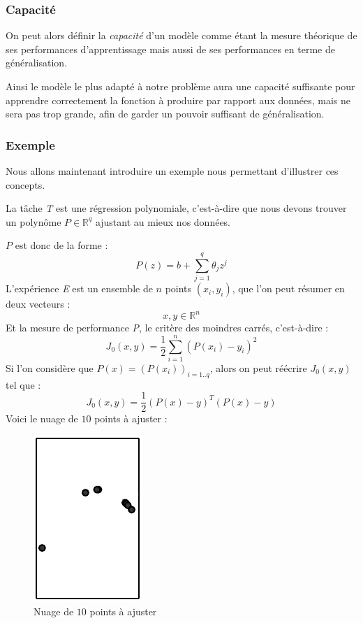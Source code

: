 \documentclass[a4paper, 11pt]{report}
\begin{document}
\subsubsection{Capacité}
On peut alors définir la \emph{capacité} d'un modèle comme étant la mesure théorique de ses performances d'apprentissage mais aussi de ses performances en terme de généralisation.

Ainsi le modèle le plus adapté à notre problème aura une capacité suffisante pour apprendre correctement la fonction à produire par rapport aux données, mais ne sera pas trop grande, afin de garder un pouvoir suffisant de généralisation.
			
\subsubsection{Exemple}
Nous allons maintenant introduire un exemple nous permettant d'illustrer ces concepts.

La tâche \emph{T} est une régression polynomiale, c'est-à-dire que nous devons trouver un polynôme $P \in \mathbb{R}^{q}$ ajustant au mieux nos données.

$P$ est donc de la forme :
$$P(z) = b + \sum_{j=1}^{q}{\theta_j z^j}$$
L'expérience \emph{E} est un ensemble de $n$ points $(x_i,y_i)$, que l'on peut résumer en deux vecteurs :
$$x, y \in \mathbb{R}^n$$
Et la mesure de performance \emph{P}, le critère des moindres carrés, c'est-à-dire :
$$J_0(x,y) =\frac{1}{2} \sum_{i=1}^{n}{(P(x_i)-y_i)^2}$$
Si l'on considère que $P(x) = (P(x_i))_{i=1..q}$, alors on peut réécrire $J_0(x,y)$ tel que :
$$J_0(x,y) = \frac{1}{2} (P(x)-y)^T(P(x)-y)$$
Voici le nuage de $10$ points à ajuster :
\begin{figure}[H]
	\begin{center}
		\includegraphics[scale=0.5]{Images/Fitting_Problem.png}
		\caption{Nuage de $10$ points à ajuster}		
	\end{center}
\end{figure}
			
\end{document}
